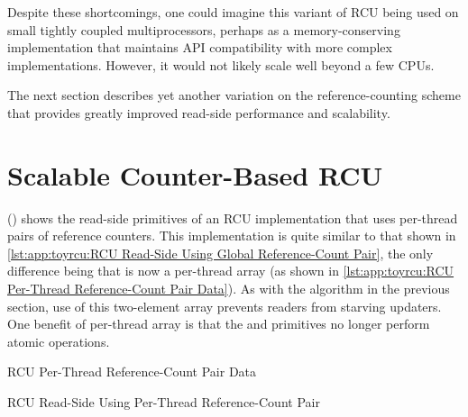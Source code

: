 Despite these shortcomings, one could imagine this variant
of RCU being used on small tightly coupled multiprocessors,
perhaps as a memory-conserving implementation that maintains
API compatibility with more complex implementations.
However, it would not likely scale well beyond a few CPUs.

The next section describes yet another variation on the reference-counting
scheme that provides greatly improved read-side performance and scalability.

\section{Scalable Counter-Based RCU}
\label{sec:app:toyrcu:Scalable Counter-Based RCU}

()
shows the read-side primitives of an RCU implementation that uses per-thread
pairs of reference counters.
This implementation is quite similar to that shown in
\cref{lst:app:toyrcu:RCU Read-Side Using Global Reference-Count Pair},
the only difference being that  is now a per-thread
array (as shown in
\cref{lst:app:toyrcu:RCU Per-Thread Reference-Count Pair Data}).
As with the algorithm in the previous section, use of this two-element
array prevents readers from starving updaters.
One benefit of per-thread  array is that the
 and  primitives no longer
perform atomic operations.

\begin{listing}

\caption{RCU Per-Thread Reference-Count Pair Data}
\label{lst:app:toyrcu:RCU Per-Thread Reference-Count Pair Data}
\end{listing}

\begin{listing}

\caption{RCU Read-Side Using Per-Thread Reference-Count Pair}
\label{lst:app:toyrcu:RCU Read-Side Using Per-Thread Reference-Count Pair}
\end{listing}

\QuickQuizEnd

